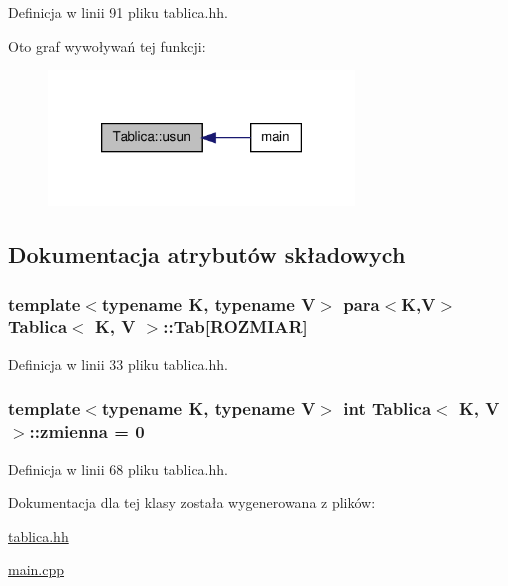 \-Definicja w linii 91 pliku tablica.\-hh.



\-Oto graf wywoływań tej funkcji\-:\nopagebreak
\begin{figure}[H]
\begin{center}
\leavevmode
\includegraphics[width=230pt]{class_tablica_a50917fdbcda74752cc30fc9787c399dd_icgraph}
\end{center}
\end{figure}




\subsection{\-Dokumentacja atrybutów składowych}
\hypertarget{class_tablica_a80783c58b0fa086f75cb319f092de578}{
\subsubsection[{\-Tab}]{\setlength{\rightskip}{0pt plus 5cm}template$<$typename \-K, typename \-V$>$ {\bf para}$<$\-K,\-V$>$ {\bf \-Tablica}$<$ \-K, \-V $>$\-::{\bf \-Tab}\mbox{[}{\bf \-R\-O\-Z\-M\-I\-A\-R}\mbox{]}}}\label{class_tablica_a80783c58b0fa086f75cb319f092de578}


\-Definicja w linii 33 pliku tablica.\-hh.

\hypertarget{class_tablica_a21c9f6e02b50a0aec70ae7c8be1d6cf0}{
\subsubsection[{zmienna}]{\setlength{\rightskip}{0pt plus 5cm}template$<$typename \-K, typename \-V$>$ int {\bf \-Tablica}$<$ \-K, \-V $>$\-::{\bf zmienna} = 0}}\label{class_tablica_a21c9f6e02b50a0aec70ae7c8be1d6cf0}


\-Definicja w linii 68 pliku tablica.\-hh.



\-Dokumentacja dla tej klasy została wygenerowana z plików\-:\begin{DoxyCompactItemize}
\item 
\hyperlink{tablica_8hh}{tablica.\-hh}\item 
\hyperlink{main_8cpp}{main.\-cpp}\end{DoxyCompactItemize}
